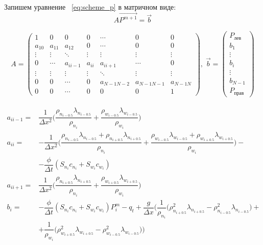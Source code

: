 Запишем уравнение ~\eqref{eq:scheme_p} в матричном виде:
\begin{equation} \label{eq:scheme_p_matrix}
A\overrightarrow{P^{m+1}} = \vec{b}
\end{equation}

\begin{equation} \label{eq:p_matrix}
\begin{aligned}
A = \begin{pmatrix}
1 & 0 & 0 & 0 & \cdots & 0 & 0 \\
a_{10} & a_{11} & a_{12} & 0 & \cdots & 0 & 0 \\
\vdots & \vdots & \ddots & \vdots & \vdots & \vdots & \vdots \\
0 & \cdots & a_{ii-1} & a_{ii} & a_{ii+1} & \cdots & 0 \\
\vdots & \vdots & \vdots & \vdots & \ddots & \vdots & \vdots\\
0 & 0 & \cdots & 0 & a_{N-1 N-2} & a_{N-1 N-1} & a_{N-1 N} \\
0 & 0 & \cdots & 0 & 0 & 0 & 1
\end{pmatrix}, \;
\vec{b} = \begin{pmatrix}
P_{\text{лев}} \\
b_1 \\
\vdots \\
b_i \\
\vdots \\
b_{N-1} \\
P_{\text{прав}}
\end{pmatrix}
\end{aligned}
\end{equation}

\begin{equation} \label{eq:p_matrix_i}
\begin{aligned}
a_{ii-1} = & \dfrac{1}{\Delta x^2} \big(\dfrac{\rho_{n_{i-0.5}} \lambda_{n_{i-0.5}}}{\rho_{n_i}} + \dfrac{\rho_{w_{i-0.5}} \lambda_{w_{i-0.5}}}{\rho_{w_i}} \big) \\
a_{ii} = & -\dfrac{1}{\Delta x^2} \big(\dfrac{\rho_{n_{i-0.5}} \lambda_{n_{i-0.5}} + \rho_{n_{i+0.5}} \lambda_{n_{i+0.5}}}{\rho_{n_i}} 
+ \dfrac{\rho_{w_{i-0.5}} \lambda_{w_{i-0.5}} + \rho_{w_{i+0.5}} \lambda_{w_{i+0.5}}}{\rho_{w_i}} \big) - \\
& - \dfrac{\phi}{\Delta t} (S_{n_i}c_{n_i}+S_{w_i}c_{w_i}) \\
a_{ii+1} = & \dfrac{1}{\Delta x^2} \big(\dfrac{\rho_{n_{i+0.5}} \lambda_{n_{i+0.5}}}{\rho_{n_i}} + \dfrac{\rho_{w_{i+0.5}} \lambda_{w_{i+0.5}}}{\rho_{w_i}} \big) \\
b_i = & - \dfrac{\phi}{\Delta t} (S_{n_i}c_{n_i}+S_{w_i}c_{w_i})P_i^m - q_t + \dfrac{g}{\Delta x} \bigg(\dfrac{1}{\rho_{n_i}} \big( \rho_{n_{i+0.5}}^2 \lambda_{n_{i+0.5}} 
  - \rho_{n_{i-0.5}}^2 \lambda_{n_{i-0.5}} \big) + \\
  &+ \dfrac{1}{\rho_{w_i}} \big( \rho_{w_{i+0.5}}^2 \lambda_{w_{i+0.5}} 
  - \rho_{w_{i-0.5}}^2 \lambda_{w_{i-0.5}} \big)\bigg)
\end{aligned}
\end{equation}

